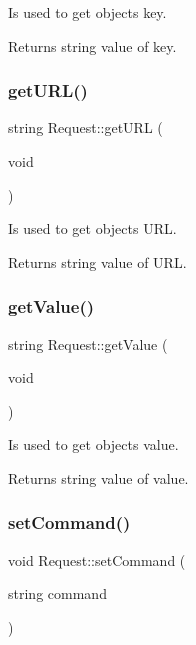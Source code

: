 Is used to get objects\textquotesingle{} key. 

\begin{DoxyReturn}{Returns}
string value of key. 
\end{DoxyReturn}
\mbox{\label{classRequest_a49d0bafc034c350c8af8c3bb666e0099}} 
\subsubsection{\texorpdfstring{get\+U\+R\+L()}{getURL()}}
{\footnotesize\ttfamily string Request\+::get\+U\+RL (\begin{DoxyParamCaption}\item[{void}]{ }\end{DoxyParamCaption})}



Is used to get objects\textquotesingle{} U\+RL. 

\begin{DoxyReturn}{Returns}
string value of U\+RL. 
\end{DoxyReturn}
\mbox{\label{classRequest_adf447291d428212c0c6d93e4c72fb127}} 
\subsubsection{\texorpdfstring{get\+Value()}{getValue()}}
{\footnotesize\ttfamily string Request\+::get\+Value (\begin{DoxyParamCaption}\item[{void}]{ }\end{DoxyParamCaption})}



Is used to get objects\textquotesingle{} value. 

\begin{DoxyReturn}{Returns}
string value of value. 
\end{DoxyReturn}
\mbox{\label{classRequest_a4fe67f0c9cccfd530174eb3d8fb54013}} 
\subsubsection{\texorpdfstring{set\+Command()}{setCommand()}}
{\footnotesize\ttfamily void Request\+::set\+Command (\begin{DoxyParamCaption}\item[{string}]{command }\end{DoxyParamCaption})}




